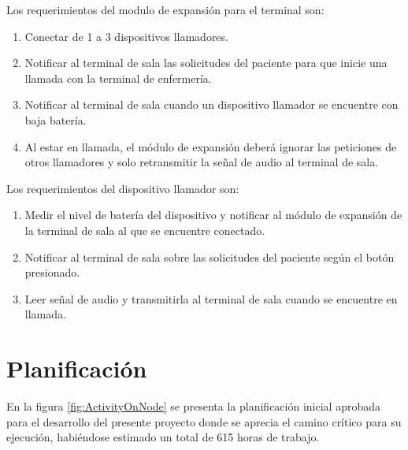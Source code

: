Los requerimientos del  modulo de expansión para el terminal son:

\begin{enumerate}

\item Conectar de 1 a 3 dispositivos llamadores.

\item Notificar al terminal de sala las solicitudes del paciente para que inicie una llamada con la terminal de enfermería.

\item Notificar al terminal de sala cuando un dispositivo llamador se encuentre con baja batería.

\item Al estar en llamada, el módulo de expansión deberá ignorar las peticiones de otros llamadores y solo retransmitir la señal de audio al terminal de sala.

\end{enumerate}

Los requerimientos del dispositivo llamador son:

\begin{enumerate}

\item Medir el nivel de batería del dispositivo y notificar al módulo de expansión de la terminal de sala al que se encuentre conectado.

\item Notificar al terminal de sala sobre las solicitudes del paciente según el botón presionado.

\item Leer señal de audio y transmitirla al terminal de sala cuando se encuentre en llamada.

\end{enumerate}

\section{Planificación}

En la figura \ref{fig:ActivityOnNode} se presenta la planificación inicial aprobada para el desarrollo del presente proyecto donde se aprecia el camino crítico para su ejecución, habiéndose estimado un total de 615 horas de trabajo.

